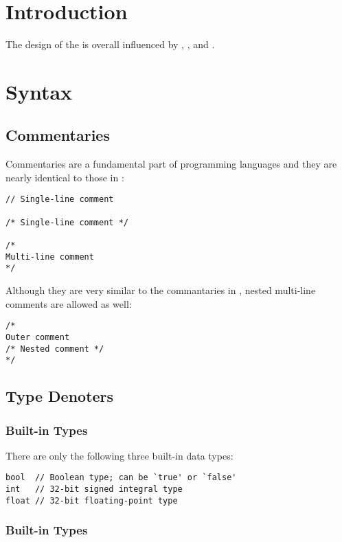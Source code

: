 \documentclass{report}
\begin{document}
\chapter{Introduction}

The design of the \xxlang is overall influenced by \java, \cpp, and \python.





\chapter{Syntax}



\section{Commentaries}

Commentaries are a fundamental part of programming languages and they are nearly identical to those
in \java:
\begin{lstlisting}
// Single-line comment

/* Single-line comment */

/*
Multi-line comment
*/
\end{lstlisting}
Although they are very similar to the commantaries in \java, nested multi-line comments are allowed as well:
\begin{lstlisting}
/*
Outer comment
/* Nested comment */
*/
\end{lstlisting}



\section{Type Denoters}

\subsection{Built-in Types}

There are only the following three built-in data types:

\begin{lstlisting}
bool  // Boolean type; can be `true' or `false'
int   // 32-bit signed integral type
float // 32-bit floating-point type
\end{lstlisting}

\subsection{Built-in Types}
\end{document}
